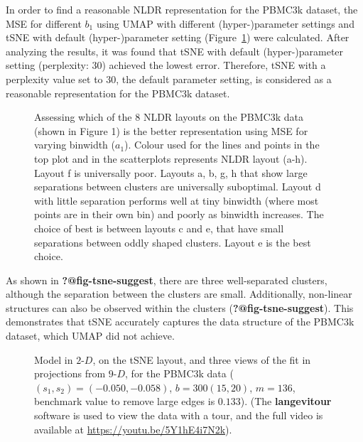 \documentclass[
  12pt]{article}
\begin{document}
In order to find a reasonable NLDR representation for the PBMC3k
dataset, the MSE for different \(b_1\) using UMAP with different
(hyper-)parameter settings and tSNE with default (hyper-)parameter
setting (Figure~\ref{fig-pbmc-mse}) were calculated. After analyzing the
results, it was found that tSNE with default (hyper-)parameter setting
(perplexity: \(30\)) achieved the lowest error. Therefore, tSNE with a
perplexity value set to \(30\), the default parameter setting, is
considered as a reasonable representation for the PBMC3k dataset.

\begin{figure}[H]


\caption{\label{fig-pbmc-mse}Assessing which of the 8 NLDR layouts on
the PBMC3k data (shown in Figure 1) is the better representation using
MSE for varying binwidth (\(a_1\)). Colour used for the lines and points
in the top plot and in the scatterplots represents NLDR layout (a-h).
Layout f is universally poor. Layouts a, b, g, h that show large
separations between clusters are universally suboptimal. Layout d with
little separation performs well at tiny binwidth (where most points are
in their own bin) and poorly as binwidth increases. The choice of best
is between layouts c and e, that have small separations between oddly
shaped clusters. Layout e is the best choice.}

\end{figure}%

As shown in \textbf{?@fig-tsne-suggest}, there are three well-separated
clusters, although the separation between the clusters are small.
Additionally, non-linear structures can also be observed within the
clusters (\textbf{?@fig-tsne-suggest}). This demonstrates that tSNE
accurately captures the data structure of the PBMC3k dataset, which UMAP
did not achieve.

\begin{figure}[H]


\caption{\label{fig-pbmc2-sc}Model in \(2\text{-}D\), on the tSNE
layout, and three views of the fit in projections from \(9\text{-}D\),
for the PBMC3k data (\((s_1,  s_2) = (-0.050,  -0.058)\),
\(b = 300   (15,  20)\), \(m = 136\), benchmark value to remove large
edges is \(0.133\)). (The \textbf{langevitour} software is used to view
the data with a tour, and the full video is available at
\url{https://youtu.be/5Y1hE4i7N2k}).}

\end{figure}%
\end{document}
